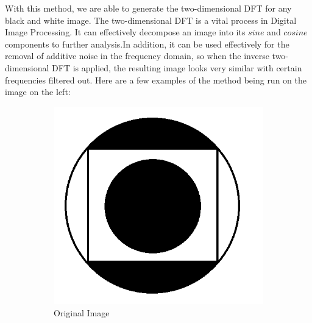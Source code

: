 \documentclass{amsproc}
\begin{document}
With this method, we are able to generate the two-dimensional DFT for any black and white image. The two-dimensional DFT  is a vital process in Digital Image Processing. It can effectively decompose an image into its $sine$ and $cosine$ components to further analysis.In addition, it can be used effectively for the removal of additive noise in the frequency domain, so when the inverse two-dimensional DFT is applied, the resulting image looks very similar with certain frequencies filtered out. Here are a few examples of the method being run on the image on the left:

\begin{figure}[h]
\centering
\begin{subfigure}{.4\textwidth}
	\centering
	\includegraphics[scale=.3]{images/dftraw1.png}
	\caption{Original Image}
	\label{fig:sub11}
\end{subfigure} \hspace{15mm}
\begin{subfigure}{.4\textwidth}
	\centering

\end{subfigure}
\end{figure}
\end{document}
